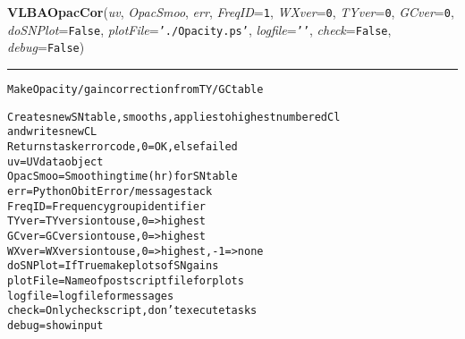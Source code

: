     \begin{boxedminipage}{\textwidth}

    \raggedright \textbf{VLBAOpacCor}(\textit{uv}, \textit{OpacSmoo}, \textit{err}, \textit{FreqID}=\texttt{1\-}, \textit{WXver}=\texttt{0\-}, \textit{TYver}=\texttt{0\-}, \textit{GCver}=\texttt{0\-}, \textit{doSNPlot}=\texttt{F\-a\-l\-s\-e\-}, \textit{plotFile}=\texttt{'\-.\-/\-O\-p\-a\-c\-i\-t\-y\-.\-p\-s\-'\-}, \textit{logfile}=\texttt{'\-'\-}, \textit{check}=\texttt{F\-a\-l\-s\-e\-}, \textit{debug}=\texttt{F\-a\-l\-s\-e\-})

    \vspace{-1.5ex}

    \rule{\textwidth}{0.5\fboxrule}
\begin{alltt}
Make Opacity/gain correction from TY/GC table

Creates new SN table, smooths, applies to highest numbered Cl 
and writes new CL
Returns task error code, 0=OK, else failed
uv         = UV data object
OpacSmoo   = Smoothing time (hr) for SN table
err        = Python Obit Error/message stack
FreqID     = Frequency group identifier
TYver      = TY version to use, 0={\textgreater} highest
GCver      = GC version to use, 0={\textgreater} highest
WXver      = WX version to use, 0={\textgreater} highest, -1={\textgreater}none
doSNPlot   = If True make plots of SN gains
plotFile   = Name of postscript file for plots
logfile    = logfile for messages
check      = Only check script, don't execute tasks
debug      = show input\end{alltt}

    \vspace{1ex}

    \end{boxedminipage}

    \label{VLBACal:VLBAPACor}
    \vspace{0.5ex}

